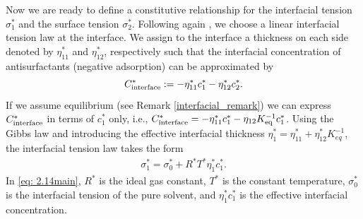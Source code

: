 \documentclass[11pt]{article}
\numberwithin{equation}{section}
\newtheorem{counter example}[theorem]{Counter Example}
\begin{document}
{Now we are ready to define a constitutive relationship for  the interfacial tension $\sigma_1^*$ and the surface tension $\sigma_2^*$. Following again \cite{picardo2016solutal}, we choose a linear interfacial tension law at the interface. We assign to the interface a  thickness on each side 
denoted by $\eta_{11}^*$ and $\eta_{12}^*$, respectively such that the interfacial concentration  of  antisurfactants (negative adsorption) can be  approximated by
\[
C_{\rm{interface}}^*:=-\eta_{11}^* c_1^*-\eta_{12}^* c_2^*. 
\]
If we assume equilibrium (see Remark \ref{interfacial_remark}) we can  express $C_{\rm{interface}}^*$ in terms of $c^*_1$ only, i.e., $C_{\rm{interface}}^*=-\eta_{11}^* c_1^*- \eta_{12}K_{\rm eq}^{-1} c_1^*$. 
Using the Gibbs law and introducing the effective interfacial thickness $\eta_1^*= \eta_{11}^*+ \eta_{12}^*{K^{-1}_{eq}} $, the interfacial tension law takes the form  
\begin{align}\label{eq: 2.14main}
\sigma_1^*=\sigma_0^*+R^*T^* \eta_1^* c_1^*.
\end{align}
In \eqref{eq: 2.14main}, $R^*$ is the ideal gas constant, $T^*$ is the constant temperature, $\sigma^*_0$ is the interfacial tension of the pure solvent, and $\eta_1^* c_1^*$ is the effective interfacial concentration. 

}
\end{document}

